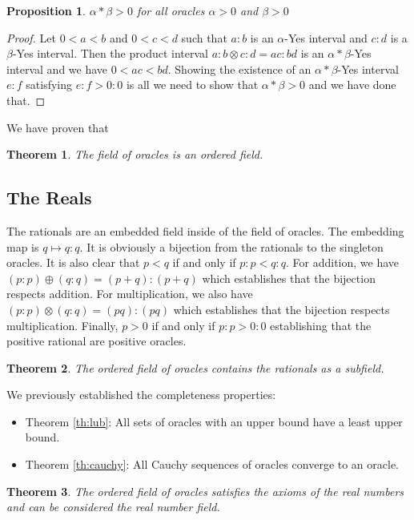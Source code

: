 \documentclass[12pt]{article}
\newtheorem{theorem}{Theorem}
\newtheorem{proposition}{Proposition}
\theoremstyle{remark}
\begin{document}
\begin{proposition}
$\alpha*\beta > 0$ for all oracles $\alpha>0$ and $\beta>0$ 
\end{proposition}

\begin{proof}
Let $0 < a < b$ and $0<c<d$ such that $a:b$ is an $\alpha$-Yes interval and $c:d$ is a $\beta$-Yes interval. Then the product interval $a:b \otimes c:d = ac:bd$ is an $\alpha*\beta$-Yes interval and we have $0 < ac < bd$. Showing the existence of an $\alpha*\beta$-Yes interval $e:f$ satisfying $e:f > 0:0$ is all we need to show that $\alpha*\beta > 0$ and we have done that.  
\end{proof}

We have proven that

\begin{theorem}
The field of oracles is an ordered field.
\end{theorem}

\subsection{The Reals}

The rationals are an embedded field inside of the field of oracles. The embedding map is $q \mapsto q:q$. It is obviously a bijection from the rationals to the singleton oracles. It is also clear that $p<q$ if and only if $p:p < q:q$. For addition, we have $(p:p) \oplus (q:q) = (p+q):(p+q)$ which establishes that the bijection respects addition. For multiplication, we also have $(p:p) \otimes (q:q) = (pq):(pq)$ which establishes that the bijection respects multiplication.  Finally, $p>0$ if and only if $p:p > 0:0$ establishing that the positive rational are positive oracles. 

\begin{theorem}
The ordered field of oracles contains the rationals as a subfield. 
\end{theorem}

We previously established the completeness properties:

\begin{itemize}
    \item  Theorem \ref{th:lub}: All sets of oracles with an upper bound have a least upper bound. 
    \item Theorem \ref{th:cauchy}: All Cauchy sequences of oracles converge to an oracle. 
\end{itemize}

\begin{theorem}
The ordered field of oracles satisfies the axioms of the real numbers and can be considered the real number field. 
\end{theorem}
\end{document}
